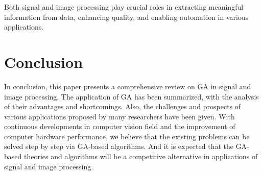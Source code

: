 \documentclass{article}
\begin{document}
Both signal and image processing play crucial roles in extracting meaningful information from data, enhancing quality, and enabling automation in various applications.

\section{Conclusion}
In conclusion, this paper presents a comprehensive review on GA in signal and image processing. The application of GA has been summarized, with the analysis of their advantages and shortcomings. Also, the challenges and prospects of various applications proposed by many researchers have been given. With continuous developments in computer vision field and the improvement of computer hardware performance, we believe that the existing problems can be solved step by step via GA-based algorithms. And it is expected that the GA-based theories and algorithms will be a competitive alternative in applications of signal and image processing. 





\printbibliography
\end{document}
